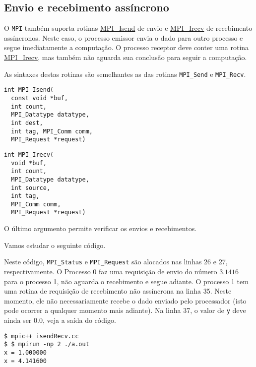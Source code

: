 


\subsection {Envio e recebimento assíncrono}

O \verb+MPI+ também suporta rotinas \href{https://www.open-mpi.org/doc/current/man3/MPI_Isend.3.php}{MPI\_Isend} de envio e \href{https://www.open-mpi.org/doc/current/man3/MPI_Irecv.3.php}{MPI\_Irecv} de recebimento assíncronos. Neste caso, o processo emissor envia o dado para outro processo e segue imediatamente a computação. O processo receptor deve conter uma rotina \href{https://www.open-mpi.org/doc/current/man3/MPI_Irecv.3.php}{MPI\_Irecv}, mas também não aguarda sua conclusão para seguir a computação.

As sintaxes destas rotinas são semelhantes as das rotinas \verb+MPI_Send+ e \verb+MPI_Recv+.

\begin{verbatim}
int MPI_Isend(
  const void *buf, 
  int count, 
  MPI_Datatype datatype, 
  int dest,
  int tag, MPI_Comm comm, 
  MPI_Request *request)
\end{verbatim}

\begin{verbatim}
int MPI_Irecv(
  void *buf, 
  int count, 
  MPI_Datatype datatype,
  int source, 
  int tag, 
  MPI_Comm comm, 
  MPI_Request *request)
\end{verbatim}
O último argumento permite verificar os envios e recebimentos.

Vamos estudar o seguinte código.



Neste código, \verb+MPI_Status+ e \verb+MPI_Request+ são alocados nas linhas 26 e 27, respectivamente. O Processo 0 faz uma requisição de envio do número $3.1416$ para o processo 1, não aguarda o recebimento e segue adiante. O processo 1 tem uma rotina de requisição de recebimento não assíncrona na linha 35. Neste momento, ele não necessariamente recebe o dado enviado pelo processador (isto pode ocorrer a qualquer momento mais adiante). Na linha 37, o valor de \verb+y+ deve ainda ser $0.0$, veja a saída do código.

\begin{verbatim}
$ mpic++ isendRecv.cc
$ $ mpirun -np 2 ./a.out
x = 1.000000
x = 4.141600
\end{verbatim}

